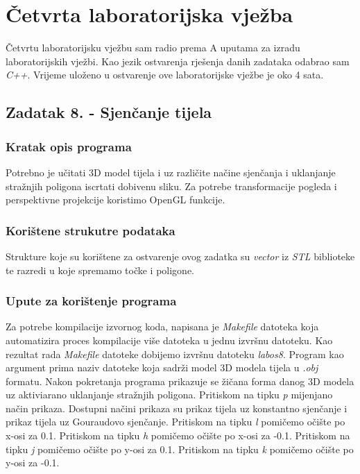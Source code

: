 \documentclass[oneside]{scrbook}
\begin{document}
\chapter{Četvrta laboratorijska vježba}
Četvrtu laboratorijsku vježbu sam radio prema A uputama za izradu laboratorijskih vježbi. Kao jezik ostvarenja rješenja danih zadataka odabrao sam \textit{C++}. Vrijeme uloženo u ostvarenje ove laboratorijske vježbe je oko 4 sata. 

\section{Zadatak 8. - Sjenčanje tijela}
\subsection{Kratak opis programa}
Potrebno je učitati 3D model tijela i uz različite načine sjenčanja i uklanjanje stražnjih poligona iscrtati dobivenu sliku. Za potrebe transformacije pogleda i perspektivne projekcije koristimo OpenGL funkcije. 

\subsection{Korištene strukutre podataka}
Strukture koje su korištene za ostvarenje ovog zadatka su \textit{vector} iz \textit{STL} biblioteke te razredi u koje spremamo točke i poligone.

\subsection{Upute za korištenje programa}
Za potrebe kompilacije izvornog koda, napisana je \textit{Makefile} datoteka koja automatizira proces kompilacije više datoteka u jednu izvršnu datoteku. Kao rezultat rada \textit{Makefile} datoteke dobijemo izvršnu datoteku \textit{labos8}. Program kao argument prima naziv datoteke koja sadrži model 3D modela tijela u \textit{.obj} formatu. Nakon pokretanja programa prikazuje se žičana forma danog 3D modela uz aktiviarano uklanjanje stražnjih poligona. Pritiskom na tipku  \textit{p} mijenjano način prikaza. Dostupni načini prikaza su prikaz tijela uz konstantno sjenčanje i prikaz tijela uz Gouraudovo sjenčanje. Pritiskom na tipku \textit{l} pomičemo očište po x-osi za 0.1. Pritiskom na tipku \textit{h} pomičemo očište po x-osi za -0.1. Pritiskom na tipku \textit{j} pomičemo očište po y-osi za 0.1. Pritiskom na tipku \textit{k} pomičemo očište po y-osi za -0.1.
\end{document}
